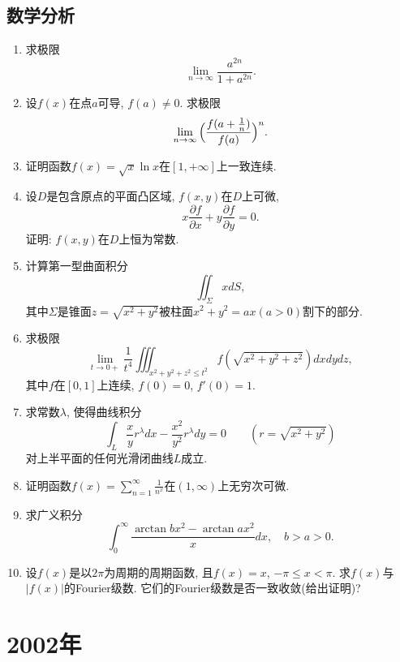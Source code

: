 \documentclass[12pt,a4paper,openany]{book}
\begin{document}
\subsection{数学分析}
\begin{enumerate}
\item 求极限
\[
\lim_{n \rightarrow \infty}{\frac{a^{2n}}{1 + a^{2n}}}.
\]

\item 设$f(x)$在点$a$可导, $f(a) \neq 0$. 求极限
\[
\lim_{n \rightarrow \infty}{\Bigl{(} \frac{f(a + \frac{1}{n})}{f(a)} \Bigr{)}^n}.
\]

\item 证明函数$f(x) = \sqrt{x}\ln{x}$在$[1, +\infty]$上一致连续.

\item 设$D$是包含原点的平面凸区域, $f(x, y)$在$D$上可微,
\[
x\frac{\partial{f}}{\partial{x}} + y\frac{\partial{f}}{\partial{y}} = 0.
\]
证明: $f(x, y)$在$D$上恒为常数.

\item 计算第一型曲面积分
\[
\iint_{\varSigma}{xdS},
\]
其中$\varSigma$是锥面$z = \sqrt{x^2 + y^2}$被柱面$x^2 + y^2 = ax (a > 0)$割下的部分.

\item 求极限
\[
\lim_{t \rightarrow 0+}{\frac{1}{t^4}\iiint_{x^2 + y^2 + z^2 \le t^2}{f(\sqrt{x^2 + y^2 + z^2})dxdydz}},
\]
其中$f$在$[0, 1]$上连续, $f(0) = 0$, $f'(0) = 1$.

\item 求常数$\lambda$, 使得曲线积分
\[
\int_{L}{\frac{x}{y}r^{\lambda}dx - \frac{x^2}{y^2}r^{\lambda}dy} = 0 \qquad (r = \sqrt{x^2 + y^2})
\]
对上半平面的任何光滑闭曲线$L$成立.

\item 证明函数$f(x) = \sum\limits_{n=1}^{\infty}{\frac{1}{n^x}}$在$(1, \infty)$上无穷次可微.

\item 求广义积分
\[
\int_{0}^{\infty}{\frac{\arctan{bx^2} - \arctan{ax^2}}{x}dx}, \quad b > a > 0.
\]

\item 设$f(x)$是以$2\pi$为周期的周期函数, 且$f(x) = x$, $-\pi \le x < \pi$. 求$f(x)$与$|f(x)|$的Fourier级数. 它们的Fourier级数是否一致收敛(给出证明)?

\end{enumerate}

\section{2002年}
\end{document}
